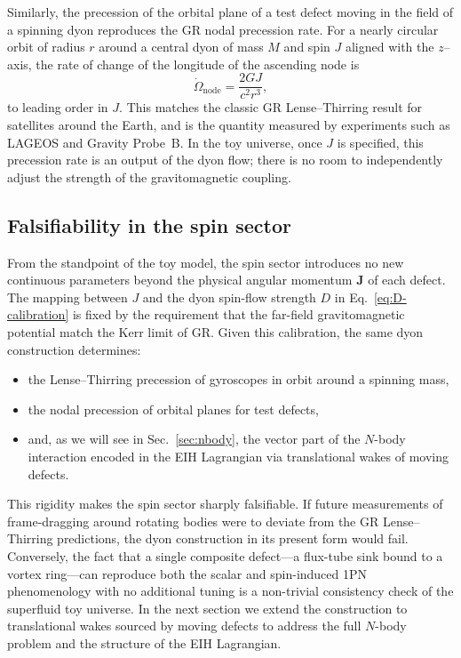 \documentclass[11pt]{article}
\begin{document}
Similarly, the precession of the orbital plane of a test defect
moving in the field of a spinning dyon reproduces the GR nodal
precession rate.
For a nearly circular orbit of radius $r$ around a central dyon of
mass $M$ and spin $J$ aligned with the $z$–axis, the rate of change
of the longitude of the ascending node is
\begin{equation}
  \dot{\Omega}_{\text{node}}
  = \frac{2GJ}{c^2 r^3},
\end{equation}
to leading order in $J$.
This matches the classic GR Lense--Thirring result for satellites
around the Earth, and is the quantity measured by experiments such
as LAGEOS and Gravity Probe~B.
In the toy universe, once $J$ is specified, this precession rate is
an output of the dyon flow; there is no room to independently adjust
the strength of the gravitomagnetic coupling.

\subsection{Falsifiability in the spin sector}
\label{subsec:spin-falsifiability}

From the standpoint of the toy model, the spin sector introduces no
new continuous parameters beyond the physical angular momentum
$\mathbf{J}$ of each defect.
The mapping between $J$ and the dyon spin-flow strength $D$ in
Eq.~\eqref{eq:D-calibration} is fixed by the requirement that the
far-field gravitomagnetic potential match the Kerr limit of GR.
Given this calibration, the same dyon construction determines:

\begin{itemize}
  \item the Lense--Thirring precession of gyroscopes in orbit around
        a spinning mass,
  \item the nodal precession of orbital planes for test defects,
  \item and, as we will see in Sec.~\ref{sec:nbody}, the vector part
        of the $N$-body interaction encoded in the EIH Lagrangian via
        translational wakes of moving defects.
\end{itemize}

This rigidity makes the spin sector sharply falsifiable.
If future measurements of frame-dragging around rotating bodies were
to deviate from the GR Lense--Thirring predictions, the dyon
construction in its present form would fail.
Conversely, the fact that a single composite defect---a flux-tube
sink bound to a vortex ring---can reproduce both the scalar and
spin-induced 1PN phenomenology with no additional tuning is a
non-trivial consistency check of the superfluid toy universe.
In the next section we extend the construction to translational wakes
sourced by moving defects to address the full $N$-body problem and the
structure of the EIH Lagrangian.
\end{document}
